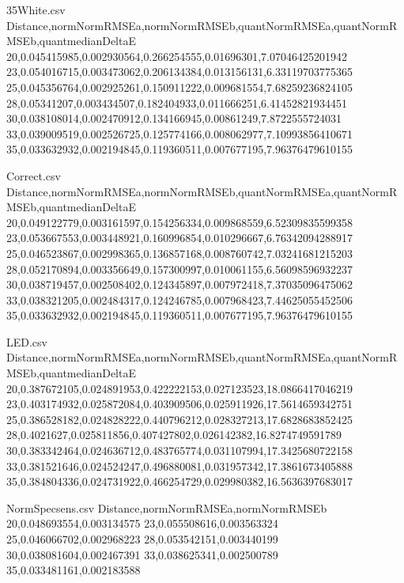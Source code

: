 \ActivateWarningFilters[csv]

\begin{filecontents*}{35White.csv}
Distance,normNormRMSEa,normNormRMSEb,quantNormRMSEa,quantNormRMSEb,quantmedianDeltaE
20,0.045415985,0.002930564,0.266254555,0.01696301,7.07046425201942
23,0.054016715,0.003473062,0.206134384,0.013156131,6.33119703775365
25,0.045356764,0.002925261,0.150911222,0.009681554,7.68259236824105
28,0.05341207,0.003434507,0.182404933,0.011666251,6.41452821934451
30,0.038108014,0.002470912,0.134166945,0.00861249,7.8722555724031
33,0.039009519,0.002526725,0.125774166,0.008062977,7.10993856410671
35,0.033632932,0.002194845,0.119360511,0.007677195,7.96376479610155
\end{filecontents*}

\begin{filecontents*}{Correct.csv}
Distance,normNormRMSEa,normNormRMSEb,quantNormRMSEa,quantNormRMSEb,quantmedianDeltaE
20,0.049122779,0.003161597,0.154256334,0.009868559,6.52309835599358
23,0.053667553,0.003448921,0.160996854,0.010296667,6.76342094288917
25,0.046523867,0.002998365,0.136857168,0.008760742,7.03241681215203
28,0.052170894,0.003356649,0.157300997,0.010061155,6.56098596932237
30,0.038719457,0.002508402,0.124345897,0.007972418,7.37035096475062
33,0.038321205,0.002484317,0.124246785,0.007968423,7.44625055452506
35,0.033632932,0.002194845,0.119360511,0.007677195,7.96376479610155
\end{filecontents*}

\begin{filecontents*}{LED.csv}
Distance,normNormRMSEa,normNormRMSEb,quantNormRMSEa,quantNormRMSEb,quantmedianDeltaE
20,0.387672105,0.024891953,0.422222153,0.027123523,18.0866417046219
23,0.403174932,0.025872084,0.403909506,0.025911926,17.5614659342751
25,0.386528182,0.024828222,0.440796212,0.028327213,17.6828683852425
28,0.4021627,0.025811856,0.407427802,0.026142382,16.8274749591789
30,0.383342464,0.024636712,0.483765774,0.031107994,17.3425680722158
33,0.381521646,0.024524247,0.496880081,0.031957342,17.3861673405888
35,0.384804336,0.024731922,0.466254729,0.029980382,16.5636397683017
\end{filecontents*}

\begin{filecontents*}{NormSpecsens.csv}
Distance,normNormRMSEa,normNormRMSEb
20,0.048693554,0.003134575
23,0.055508616,0.003563324
25,0.046066702,0.002968223
28,0.053542151,0.003440199
30,0.038081604,0.002467391
33,0.038625341,0.002500789
35,0.033481161,0.002183588
\end{filecontents*}

